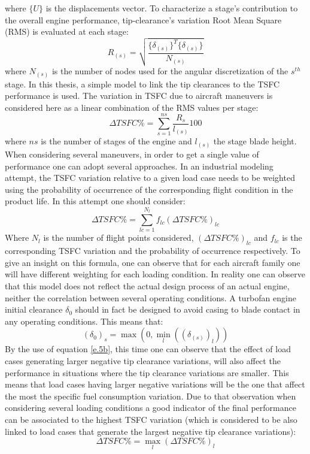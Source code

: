 where $\lbrace U \rbrace$ is the displacements vector.
To characterize a stage's contribution to the overall engine performance, tip-clearance's variation Root Mean Square (RMS) is evaluated at each stage:
\begin{equation}
\label{e.4}
R_{(s)} =\sqrt{\frac{\lbrace\delta_{(s)}\rbrace^T\lbrace\delta_{(s)}\rbrace}{N_{(s)}}}
\end{equation}
where $N_{(s)}$ is the number of nodes used for the angular discretization of the $s^{th}$ stage. 
In this thesis, a simple model to link the tip clearances to the TSFC performance is used. The variation in TSFC due to aircraft maneuvers is considered here as a linear combination of the RMS values per stage:
\begin{equation}
\label{e.5}
\Delta TSFC \% = \sum_{s=1}^{ns}\frac{R_{s}}{l_{(s)}}100
\end{equation}
where $ns$ is the number of stages of the engine and $l_{(s)}$ the stage blade height.
When considering several maneuvers, in order to get a single value of performance one can adopt several approaches.
In an industrial modeling attempt, the TSFC variation relative to a given load case needs to be weighted using the probability of occurrence  of the corresponding flight condition in the product life. 
In this attempt one should consider:
\begin{equation}
\label{e.5b}
\Delta TSFC \% = \sum_{lc=1}^{N_l}f_{lc}(\Delta TSFC \%)_{lc}
\end{equation}
Where $N_l$ is the number of flight points considered, $(\Delta TSFC \%)_{lc}$ and $f_{lc}$ is the corresponding TSFC variation and the probability of occurrence respectively. To give an insight on this formula, one can observe that for each aircraft family one will have different weighting for each loading condition. In reality one can observe that this model does not reflect the actual design process of an actual engine, neither the correlation between several operating conditions. A turbofan engine initial clearance $\delta_0$ should in fact be designed to avoid casing to blade contact in any operating conditions. This means that:
\begin{equation}
(\delta_0)_s=\max{\left(0, \min_{l}{\left((\delta_{(s)})_l\right)}\right)}
\end{equation}
By the use of equation \ref{e.5b}, this time one can observe that the effect of load cases generating larger negative tip clearance variations, will also affect the performance in situations where the tip clearance variations are smaller. This means that load cases having larger negative variations will be the one that affect the most the specific fuel consumption variation. Due to that observation when considering several loading conditions a good indicator of the final performance can be associated to the highest TSFC variation (which is considered to be also linked to load cases that generate the largest negative tip clearance variations):
 \begin{equation}
 \label{e.5c}
 \Delta TSFC \% = \max_l(\Delta TSFC \%)_l
 \end{equation}
